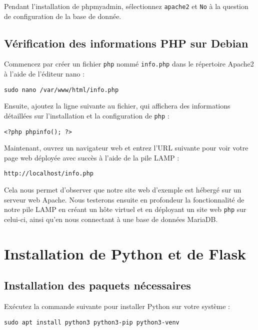 Pendant l'installation de phpmyadmin, sélectionnez \texttt{apache2} et \texttt{No} à la question de configuration de la base de donnée.

\subsection{Vérification des informations PHP sur Debian}

Commencez par créer un fichier \texttt{php} nommé \texttt{info.php} dans le répertoire Apache2 à l'aide de l'éditeur nano :

\begin{lstlisting}
sudo nano /var/www/html/info.php
\end{lstlisting}

Ensuite, ajoutez la ligne suivante au fichier, qui affichera des informations détaillées sur l'installation et la configuration de \texttt{php} :

\begin{lstlisting}[style=tf]
<?php phpinfo(); ?>
\end{lstlisting}

Maintenant, ouvrez un navigateur web et entrez l'URL suivante pour voir votre page web déployée avec succès à l'aide de la pile LAMP :

\begin{lstlisting}
http://localhost/info.php
\end{lstlisting}

Cela nous permet d'observer que notre site web d'exemple est hébergé sur un serveur web Apache. Nous testerons ensuite en profondeur la fonctionnalité de notre pile LAMP en créant un hôte virtuel et en déployant un site web \texttt{php} sur celui-ci, ainsi qu'en nous connectant à une base de données MariaDB.

\section{Installation de Python et de Flask}

\subsection{Installation des paquets nécessaires}
Exécutez la commande suivante pour installer Python sur votre système :

\begin{lstlisting}
sudo apt install python3 python3-pip python3-venv
\end{lstlisting}


